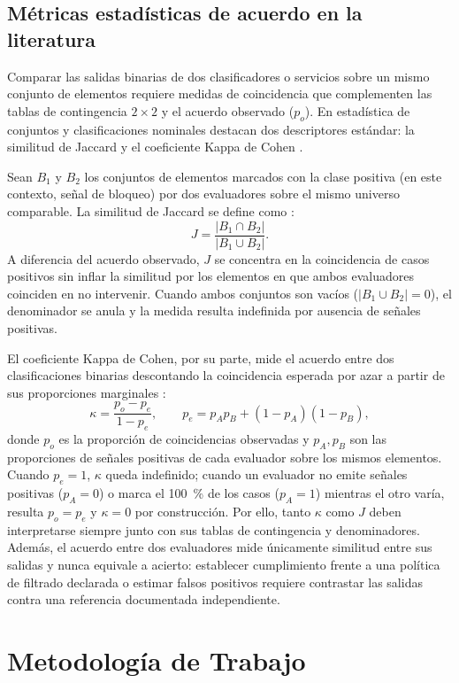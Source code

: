 \documentclass[10pt,a4paper]{article}
\begin{document}
\subsection{Métricas estadísticas de acuerdo en la literatura}\label{subsec:metricas}

Comparar las salidas binarias de dos clasificadores o servicios sobre un mismo conjunto de elementos requiere medidas de coincidencia que complementen las tablas de contingencia $2\times 2$ y el acuerdo observado ($p_o$). En estadística de conjuntos y clasificaciones nominales destacan dos descriptores estándar: la similitud de Jaccard \cite{kosub2016} y el coeficiente Kappa de Cohen \cite{cohen1960}.

Sean $B_1$ y $B_2$ los conjuntos de elementos marcados con la clase positiva (en este contexto, señal de bloqueo) por dos evaluadores sobre el mismo universo comparable. La similitud de Jaccard se define como \cite{kosub2016}:
\[
J = \frac{|B_1 \cap B_2|}{|B_1 \cup B_2|}.
\]
A diferencia del acuerdo observado, $J$ se concentra en la coincidencia de casos positivos sin inflar la similitud por los elementos en que ambos evaluadores coinciden en no intervenir. Cuando ambos conjuntos son vacíos ($|B_1 \cup B_2| = 0$), el denominador se anula y la medida resulta indefinida por ausencia de señales positivas.

El coeficiente Kappa de Cohen, por su parte, mide el acuerdo entre dos clasificaciones binarias descontando la coincidencia esperada por azar a partir de sus proporciones marginales \cite{cohen1960}:
\[
\kappa = \frac{p_o - p_e}{1 - p_e}, \qquad p_e = p_A p_B + (1 - p_A)(1 - p_B),
\]
donde $p_o$ es la proporción de coincidencias observadas y $p_A, p_B$ son las proporciones de señales positivas de cada evaluador sobre los mismos elementos. Cuando $p_e = 1$, $\kappa$ queda indefinido; cuando un evaluador no emite señales positivas ($p_A = 0$) o marca el 100~\% de los casos ($p_A = 1$) mientras el otro varía, resulta $p_o = p_e$ y $\kappa = 0$ por construcción. Por ello, tanto $\kappa$ como $J$ deben interpretarse siempre junto con sus tablas de contingencia y denominadores. Además, el acuerdo entre dos evaluadores mide únicamente similitud entre sus salidas y nunca equivale a acierto: establecer cumplimiento frente a una política de filtrado declarada o estimar falsos positivos requiere contrastar las salidas contra una referencia documentada independiente.

\section{Metodología de Trabajo}\label{sec:metodologia}
\end{document}
